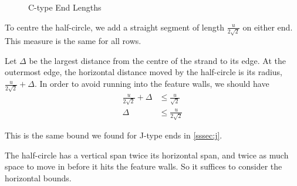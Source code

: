 \documentclass[openany]{book}
\begin{document}
\begin{figure}[H]\centering
{}\caption{C-type End Lengths}
\end{figure}

To centre the half-circle, %
we add a straight segment of length $\frac{u}{2\sqrt 2}$ on either end. This measure is the same for all rows.


Let $\Delta$ be the largest distance from the centre of the strand to its edge. 
At the outermost edge, the horizontal distance moved by the half-circle is its radius, $\frac{u}{2\sqrt 2}+\Delta$. In order to avoid running into the feature walls, we should have
\begin{align*}
\frac{u}{2\sqrt 2}+\Delta & \leq \frac{u}{\sqrt 2}
\\\Delta & \leq \frac{u}{2\sqrt 2}
\end{align*}

This is the same bound we found for J-type ends in \ref{sssec:j}.

The half-circle has a vertical span twice its horizontal span, and twice as much space to move in before it hits the feature walls. So it suffices to consider the horizontal bounds.
\end{document}

